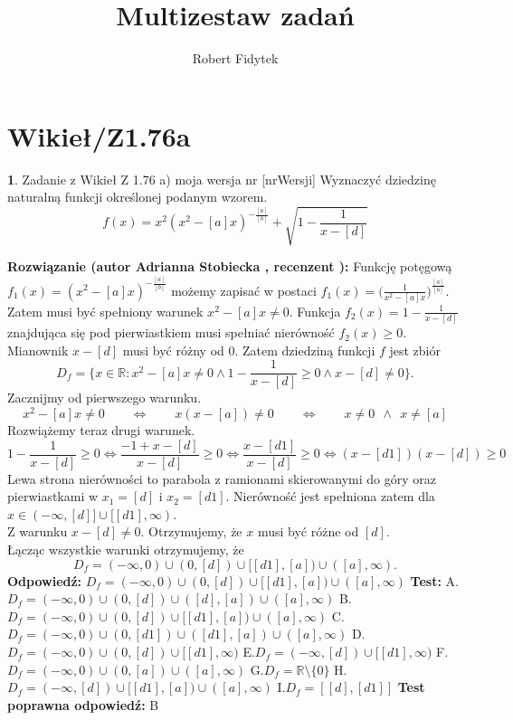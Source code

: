 \documentclass[12pt, a4paper]{article}
\title{Multizestaw zadań}
\author{Robert Fidytek}
\date{}
\theoremstyle{definition} %
\newtheorem{zad}{}
\newcommand{\kategoria}[1]{\section{#1}} %
\newcommand{\zadStart}[1]{\begin{zad}#1\newline} %
\newcommand{\zadStop}{\end{zad}}   %
\newcommand{\rozwStart}[2]{\noindent \textbf{Rozwiązanie (autor #1 , recenzent #2): }\newline} %
\newcommand{\rozwStop}{\newline}                                            %
\newcommand{\odpStart}{\noindent \textbf{Odpowiedź:}\newline}    %
\newcommand{\odpStop}{\newline}                                             %
\newcommand{\testStart}{\noindent \textbf{Test:}\newline} %
\newcommand{\testStop}{\newline} %
\newcommand{\kluczStart}{\noindent \textbf{Test poprawna odpowiedź:}\newline} %
\newcommand{\kluczStop}{\newline} %
\begin{document}
\maketitle


\kategoria{Wikieł/Z1.76a}
\zadStart{Zadanie z Wikieł Z 1.76 a) moja wersja nr [nrWersji]}
Wyznaczyć dziedzinę naturalną funkcji określonej podanym wzorem.
$$f(x)=x^2(x^2-[a]x)^{-\frac{[a]}{[b]}}+\sqrt{1-\frac{1}{x-[d]}}$$
\zadStop
\rozwStart{Adrianna Stobiecka}{}
Funkcję potęgową $f_1(x)=(x^2-[a]x)^{-\frac{[a]}{[b]}}$ możemy zapisać w postaci $f_1(x)=\big(\frac{1}{x^2-[a]x}\big)^{\frac{[a]}{[b]}}$. Zatem musi być spełniony warunek $x^2-[a]x\ne0$. Funkcja $f_2(x)=1-\frac{1}{x-[d]}$ znajdująca się pod pierwiastkiem musi spełniać nierówność $f_2(x)\geq0$. Mianownik $x-[d]$ musi być różny od $0$. Zatem dziedziną funkcji $f$ jest zbiór
$$D_{f}=\bigg\{x\in\mathbb{R}:x^2-[a]x\ne0 \land 1-\frac{1}{x-[d]}\geq0 \land x-[d]\ne0\bigg\}.$$
Zacznijmy od pierwszego warunku.
$$x^2-[a]x\ne0\qquad\Leftrightarrow\qquad x(x-[a])\ne0\qquad\Leftrightarrow\qquad x\ne0~~\land~~ x\ne[a]$$
Rozwiążemy teraz drugi warunek.
$$1-\frac{1}{x-[d]}\geq0\Leftrightarrow\frac{-1+x-[d]}{x-[d]}\geq0\Leftrightarrow\frac{x-[d1]}{x-[d]}\geq0\Leftrightarrow(x-[d1])(x-[d])\geq0$$
Lewa strona nierówności to parabola z ramionami skierowanymi do góry oraz pierwiastkami w $x_1=[d]$ i $x_2=[d1]$. Nierówność jest spełniona zatem dla $x\in(-\infty,[d]]\cup[[d1],\infty)$.
\\Z warunku $x-[d]\ne0$. Otrzymujemy, że $x$ musi być różne od $[d]$.
\\Łącząc wszystkie warunki otrzymujemy, że 
$$D_{f}=(-\infty,0)\cup(0,[d])\cup[[d1],[a])\cup([a],\infty).$$
\rozwStop
\odpStart
$D_{f}=(-\infty,0)\cup(0,[d])\cup[[d1],[a])\cup([a],\infty)$
\odpStop
\testStart
A.$D_{f}=(-\infty,0)\cup(0,[d])\cup([d],[a])\cup([a],\infty)$
B.$D_{f}=(-\infty,0)\cup(0,[d])\cup[[d1],[a])\cup([a],\infty)$
C.$D_{f}=(-\infty,0)\cup(0,[d1])\cup([d1],[a])\cup([a],\infty)$
D.$D_{f}=(-\infty,0)\cup(0,[d])\cup[[d1],\infty)$
E.$D_{f}=(-\infty,[d])\cup[[d1],\infty)$
F.$D_{f}=(-\infty,0)\cup(0,[a])\cup([a],\infty)$
G.$D_{f}=\mathbb{R}\setminus\{0\}$
H.$D_{f}=(-\infty,[d])\cup[[d1],[a])\cup([a],\infty)$
I.$D_{f}=[[d],[d1]]$
\testStop
\kluczStart
B
\kluczStop
\end{document}
